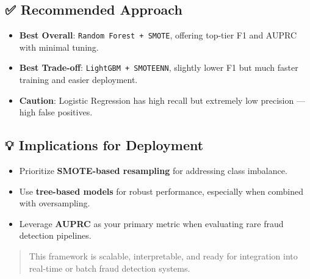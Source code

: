 \documentclass[
  letterpaper,
  DIV=11,
  numbers=noendperiod]{scrartcl}
\providecommand{\tightlist}{%
  \setlength{\itemsep}{0pt}\setlength{\parskip}{0pt}}
\begin{document}
\subsection{✅ Recommended Approach}\label{recommended-approach}

\begin{itemize}
\tightlist
\item
  \textbf{Best Overall}: \texttt{Random\ Forest\ +\ SMOTE}, offering
  top-tier F1 and AUPRC with minimal tuning.
\item
  \textbf{Best Trade-off}: \texttt{LightGBM\ +\ SMOTEENN}, slightly
  lower F1 but much faster training and easier deployment.
\item
  \textbf{Caution}: Logistic Regression has high recall but extremely
  low precision --- high false positives.
\end{itemize}

\subsection{💡 Implications for
Deployment}\label{implications-for-deployment}

\begin{itemize}
\tightlist
\item
  Prioritize \textbf{SMOTE-based resampling} for addressing class
  imbalance.
\item
  Use \textbf{tree-based models} for robust performance, especially when
  combined with oversampling.
\item
  Leverage \textbf{AUPRC} as your primary metric when evaluating rare
  fraud detection pipelines.
\end{itemize}

\begin{quote}
This framework is scalable, interpretable, and ready for integration
into real-time or batch fraud detection systems.
\end{quote}
\end{document}
